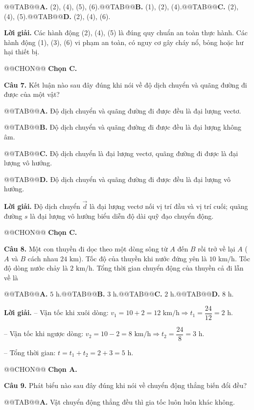 \documentclass{article}
\begin{document}
@@TAB@@\textbf{A.} (2), (4), (5), (6).@@TAB@@\textbf{B.} (1), (2), (4).@@TAB@@\textbf{C.} (2), (4), (5).@@TAB@@\textbf{D.} (2), (4), (6).

\textbf{Lời giải.} Các hành động (2), (4), (5) là đúng quy chuẩn an toàn thực hành. Các hành động (1), (3), (6) vi phạm an toàn, có nguy cơ gây cháy nổ, bỏng hoặc hư hại thiết bị.

@@CHON@@ \textbf{Chọn C.}

\textbf{Câu 7.} Kết luận nào sau đây đúng khi nói về độ dịch chuyển và quãng đường đi được của một vật?

@@TAB@@\textbf{A.} Độ dịch chuyển và quãng đường đi được đều là đại lượng vectơ.

@@TAB@@\textbf{B.} Độ dịch chuyển và quãng đường đi được đều là đại lượng không âm.

@@TAB@@\textbf{C.} Độ dịch chuyển là đại lượng vectơ, quãng đường đi được là đại lượng vô hướng.

@@TAB@@\textbf{D.} Độ dịch chuyển và quãng đường đi được đều là đại lượng vô hướng.

\textbf{Lời giải.} Độ dịch chuyển $\vec{d}$ là đại lượng vectơ nối vị trí đầu và vị trí cuối; quãng đường $s$ là đại lượng vô hướng biểu diễn độ dài quỹ đạo chuyển động.

@@CHON@@ \textbf{Chọn C.}

\textbf{Câu 8.} Một con thuyền đi dọc theo một dòng sông từ $A$ đến $B$ rồi trở về lại $A$ ($A$ và $B$ cách nhau $24\text{ km}$). Tốc độ của thuyền khi nước đứng yên là $10\text{ km/h}$. Tốc độ dòng nước chảy là $2\text{ km/h}$. Tổng thời gian chuyển động của thuyền cả đi lẫn về là

@@TAB@@\textbf{A.} $5\text{ h}$.@@TAB@@\textbf{B.} $3\text{ h}$.@@TAB@@\textbf{C.} $2\text{ h}$.@@TAB@@\textbf{D.} $8\text{ h}$.

\textbf{Lời giải.} -- Vận tốc khi xuôi dòng: $v_1 = 10 + 2 = 12\text{ km/h} \Rightarrow t_1 = \dfrac{24}{12} = 2\text{ h}$.

-- Vận tốc khi ngược dòng: $v_2 = 10 - 2 = 8\text{ km/h} \Rightarrow t_2 = \dfrac{24}{8} = 3\text{ h}$.

-- Tổng thời gian: $t = t_1 + t_2 = 2 + 3 = 5\text{ h}$.

@@CHON@@ \textbf{Chọn A.}

\textbf{Câu 9.} Phát biểu nào sau đây đúng khi nói về chuyển động thẳng biến đổi đều?

@@TAB@@\textbf{A.} Vật chuyển động thẳng đều thì gia tốc luôn luôn khác không.
\end{document}
